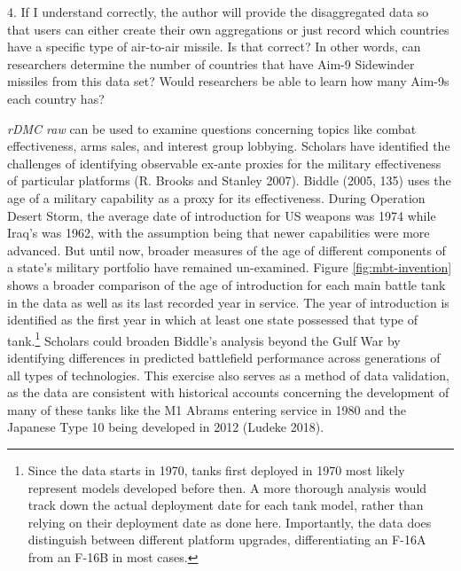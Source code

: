 \documentclass[
]{article}
\begin{document}
4. If I understand correctly, the author will provide the disaggregated data so that users can either create their own aggregations or just record which countries have a specific type of air-to-air missile. Is that correct? In other words, can researchers determine the number of countries that have Aim-9 Sidewinder missiles from this data set? Would researchers be able to learn how many Aim-9\textquotesingle s each country has?

\emph{rDMC raw} can be used to examine questions concerning topics like combat effectiveness, arms sales, and interest group lobbying. Scholars have identified the challenges of identifying observable ex-ante proxies for the military effectiveness of particular platforms (R. Brooks and Stanley 2007). Biddle (2005, 135) uses the age of a military capability as a proxy for its effectiveness. During Operation Desert Storm, the average date of introduction for US weapons was 1974 while Iraq's was 1962, with the assumption being that newer capabilities were more advanced. But until now, broader measures of the age of different components of a state's military portfolio have remained un-examined. Figure \ref{fig:mbt-invention} shows a broader comparison of the age of introduction for each main battle tank in the data as well as its last recorded year in service. The year of introduction is identified as the first year in which at least one state possessed that type of tank.\footnote{Since the data starts in 1970, tanks first deployed in 1970 most likely represent models developed before then. A more thorough analysis would track down the actual deployment date for each tank model, rather than relying on their deployment date as done here. Importantly, the data does distinguish between different platform upgrades, differentiating an F-16A from an F-16B in most cases.} Scholars could broaden Biddle's analysis beyond the Gulf War by identifying differences in predicted battlefield performance across generations of all types of technologies. This exercise also serves as a method of data validation, as the data are consistent with historical accounts concerning the development of many of these tanks like the M1 Abrams entering service in 1980 and the Japanese Type 10 being developed in 2012 (Ludeke 2018).
\end{document}
